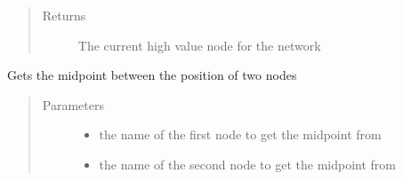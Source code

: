 \documentclass[letterpaper,10pt,english]{sphinxmanual}
\begin{document}
\begin{fulllineitems}

\begin{fulllineitems}
\label{\detokenize{source/yawning_titan.envs.generic.core:yawning_titan.envs.generic.core.network_interface.NetworkInterface.get_high_value_node}}\begin{quote}\begin{description}
\item[{Returns}] \leavevmode
\sphinxAtStartPar
The current high value node for the network

\end{description}\end{quote}

\end{fulllineitems}


\begin{fulllineitems}
\label{\detokenize{source/yawning_titan.envs.generic.core:yawning_titan.envs.generic.core.network_interface.NetworkInterface.get_midpoint}}
\sphinxAtStartPar
Gets the midpoint between the position of two nodes
\begin{quote}\begin{description}
\item[{Parameters}] \leavevmode\begin{itemize}
\item {}
\sphinxAtStartPar
{} \textendash{} the name of the first node to get the midpoint from

\item {}
\sphinxAtStartPar
{} \textendash{} the name of the second node to get the midpoint from


\end{itemize}
\end{description}
\end{quote}
\end{fulllineitems}
\end{fulllineitems}
\end{document}
